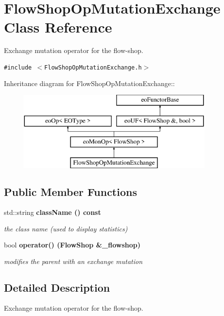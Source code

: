 \section{Flow\-Shop\-Op\-Mutation\-Exchange Class Reference}
\label{classFlowShopOpMutationExchange}
Exchange mutation operator for the flow-shop.  


{\tt \#include $<$Flow\-Shop\-Op\-Mutation\-Exchange.h$>$}

Inheritance diagram for Flow\-Shop\-Op\-Mutation\-Exchange::\begin{figure}[H]
\begin{center}
\leavevmode
\includegraphics[height=4cm]{classFlowShopOpMutationExchange}
\end{center}
\end{figure}
\subsection*{Public Member Functions}
\begin{CompactItemize}
\item 
std::string \bf{class\-Name} () const \label{classFlowShopOpMutationExchange_36a926c9fe21346db26fadf1d50c1c7a}

\begin{CompactList}\small\item\em the class name (used to display statistics) \item\end{CompactList}\item 
bool \bf{operator()} (\bf{Flow\-Shop} \&\_\-flowshop)
\begin{CompactList}\small\item\em modifies the parent with an exchange mutation \item\end{CompactList}\end{CompactItemize}


\subsection{Detailed Description}
Exchange mutation operator for the flow-shop. 



